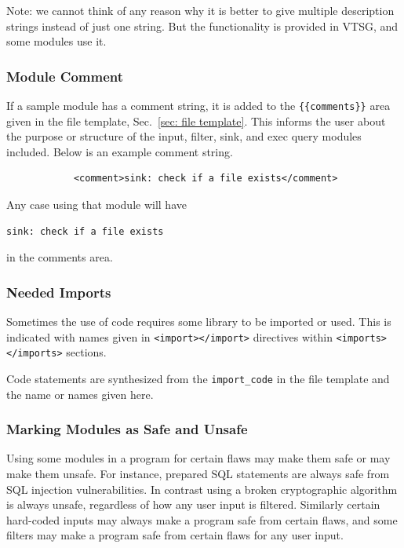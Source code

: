 \documentclass[12pt]{article}
\begin{document}
Note: we cannot think of any reason why it is better to give multiple description
strings instead of just one string.  But the functionality is provided in VTSG, and
some modules use it.


\subsubsection{Module Comment}
\label{sec:module comment}

If a sample module has a comment string, it is added to the
\verb|{{comments}}| area given in the file template, Sec.~\ref{sec: file template}.
This informs the user about the purpose or structure of the input, filter, sink, and
exec query modules included.  Below is an example comment string.

\begin{verbatim}
            <comment>sink: check if a file exists</comment>
\end{verbatim}

Any case using that module will have
\begin{verbatim}
sink: check if a file exists
\end{verbatim}
in the comments area.


\subsubsection{Needed Imports}
\label{sec:module import}

Sometimes the use of code requires some library to be imported or used.  This is
indicated with names given in \verb|<import></import>| directives within
\verb|<imports></imports>| sections.

Code statements are synthesized from the \verb|import_code| in the file template and
the name or names given here.


\subsubsection{Marking Modules as Safe and Unsafe}
\label{sec:safe or unsafe}

Using some modules in a program for certain flaws may make them safe or may make them
unsafe.  For instance, prepared SQL statements are always safe from SQL injection
vulnerabilities.  In contrast using a broken cryptographic algorithm is always
unsafe, regardless of how any user input is filtered.  Similarly certain
hard-coded inputs may always make a program safe from certain flaws, and some filters
may make a program safe from certain flaws for any user input.
\end{document}
